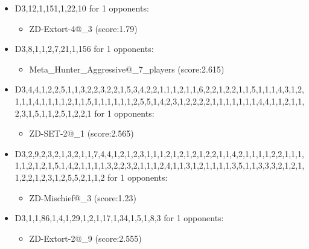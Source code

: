 \begin{appendices}
\begin{itemize}
        \item D3,12,1,151,1,22,10 for 1 opponents:
        \begin{multicols}{3}
            \begin{itemize}
                \item ZD-Extort-4@\_3 (score:1.79)
            \end{itemize}
        \end{multicols}

        \item D3,8,1,1,2,7,21,1,156 for 1 opponents:
        \begin{multicols}{3}
            \begin{itemize}
                \item Meta\_Hunter\_Aggressive@\_7\_players (score:2.615)
            \end{itemize}
        \end{multicols}

        \item D3,4,4,1,2,2,5,1,1,3,2,2,3,2,2,1,5,3,4,2,2,1,1,1,2,1,1,6,2,2,1,2,2,1,1,5,1,1,1,4,3,1,2,1,1,1,4,1,1,1,1,2,1,1,5,1,1,1,1,1,1,2,5,5,1,4,2,3,1,2,2,2,2,1,1,1,1,1,1,1,4,4,1,1,2,1,1,2,3,1,5,1,1,2,5,1,2,2,1 for 1 opponents:
        \begin{multicols}{3}
            \begin{itemize}

                \item ZD-SET-2@\_1 (score:2.565)
            \end{itemize}
        \end{multicols}

        \item D3,2,9,2,3,2,1,3,2,1,1,7,4,4,1,2,1,2,3,1,1,1,2,1,2,1,2,1,2,2,1,1,4,2,1,1,1,1,2,2,1,1,1,1,1,2,1,2,1,5,1,4,2,1,1,1,1,3,2,2,3,2,1,1,1,2,4,1,1,3,1,2,1,1,1,1,3,5,1,1,3,3,3,2,1,2,1,1,2,2,1,2,3,1,2,5,5,2,1,1,2 for 1 opponents:
        \begin{multicols}{3}
            \begin{itemize}
                \item ZD-Mischief@\_3 (score:1.23)
            \end{itemize}
        \end{multicols}

        \item D3,1,1,86,1,4,1,29,1,2,1,17,1,34,1,5,1,8,3 for 1 opponents:
        \begin{multicols}{3}
            \begin{itemize}
                \item ZD-Extort-2@\_9 (score:2.555)
            \end{itemize}
        \end{multicols}


\end{itemize}
\end{appendices}
